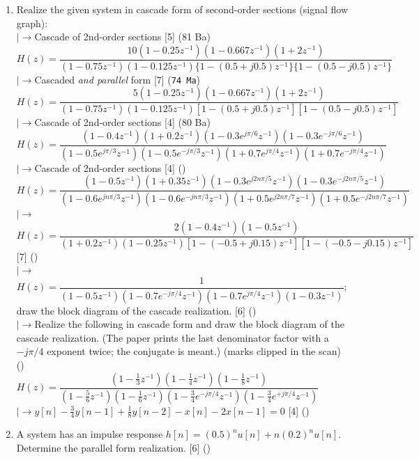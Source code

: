 \documentclass[12pt]{article}
\newcommand{\lb}{\\$\left|\rightarrow\right.$}
\begin{document}
\begin{enumerate}[topsep=0pt, noitemsep]
      \item Realize the given system in cascade form of second-order sections (signal flow graph):
        \lb Cascade of 2nd-order sections \hfill [5] (81 Ba)\\
          \mbox{}\hfill {\small $H(z)=\dfrac{10(1-0.25z^{-1})(1-0.667z^{-1})(1+2z^{-1})}{(1-0.75z^{-1})(1-0.125z^{-1})\{1-(0.5+j0.5)z^{-1}\}\{1-(0.5-j0.5)z^{-1}\}}$}\hfill\mbox{}
        \lb Cascaded \emph{and parallel} form \hfill [7] (\texttt{74 Ma})\\
          \mbox{}\hfill {\small $H(z)=\dfrac{5(1-0.25z^{-1})(1-0.667z^{-1})(1+2z^{-1})}{(1-0.75z^{-1})(1-0.125z^{-1})[1-(0.5+j0.5)z^{-1}][1-(0.5-j0.5)z^{-1}]}$}\hfill\mbox{}
        \lb Cascade of 2nd-order sections \hfill [4] (80 Ba)\\
          \mbox{}\hfill {\small $H(z)=\dfrac{(1-0.4z^{-1})(1+0.2z^{-1})(1-0.3e^{j\pi/6}z^{-1})(1-0.3e^{-j\pi/6}z^{-1})}{(1-0.5e^{j\pi/3}z^{-1})(1-0.5e^{-j\pi/3}z^{-1})(1+0.7e^{j\pi/4}z^{-1})(1+0.7e^{-j\pi/4}z^{-1})}$}\hfill\mbox{}
        \lb Cascade of 2nd-order sections \hfill [4] ()\\
          \mbox{}\hfill {\small $H(z)=\dfrac{(1-0.5z^{-1})(1+0.35z^{-1})(1-0.3e^{j2n\pi/5}z^{-1})(1-0.3e^{-j2n\pi/5}z^{-1})}{(1-0.6e^{jn\pi/3}z^{-1})(1-0.6e^{-jn\pi/3}z^{-1})(1+0.5e^{j2n\pi/7}z^{-1})(1+0.5e^{-j2n\pi/7}z^{-1})}$}\hfill\mbox{}
        \lb $H(z)=\dfrac{2(1-0.4z^{-1})(1-0.5z^{-1})}{(1+0.2z^{-1})(1-0.25z^{-1})[1-(-0.5+j0.15)z^{-1}][1-(-0.5-j0.15)z^{-1}]}$ \hfill [7] ()
        \lb $H(z)=\dfrac{1}{(1-0.5z^{-1})(1-0.7e^{-j\pi/4}z^{-1})(1-0.7e^{j\pi/4}z^{-1})(1-0.3z^{-1})}$; draw the block diagram of the cascade realization. \hfill [6] ()
        \lb Realize the following in cascade form and draw the block diagram of the cascade realization. (The paper prints the last denominator factor with a $-j\pi/4$ exponent twice; the conjugate is meant.) \hfill (marks clipped in the scan) ()\\
          \mbox{}\hfill $H(z)=\dfrac{(1-\tfrac13 z^{-1})(1-\tfrac14 z^{-1})(1-\tfrac18 z^{-1})}{(1-\tfrac56 z^{-1})(1-\tfrac16 z^{-1})(1-\tfrac34 e^{-j\pi/4}z^{-1})(1-\tfrac34 e^{+j\pi/4}z^{-1})}$\hfill\mbox{}
        \lb $y[n]-\tfrac34 y[n-1]+\tfrac18 y[n-2]-x[n]-2x[n-1]=0$ \hfill [4] ()

      \item A system has an impulse response $h[n]=(0.5)^n u[n]+n(0.2)^n u[n]$. Determine the parallel form realization. \hfill [6] ()
    \end{enumerate}
\end{document}
